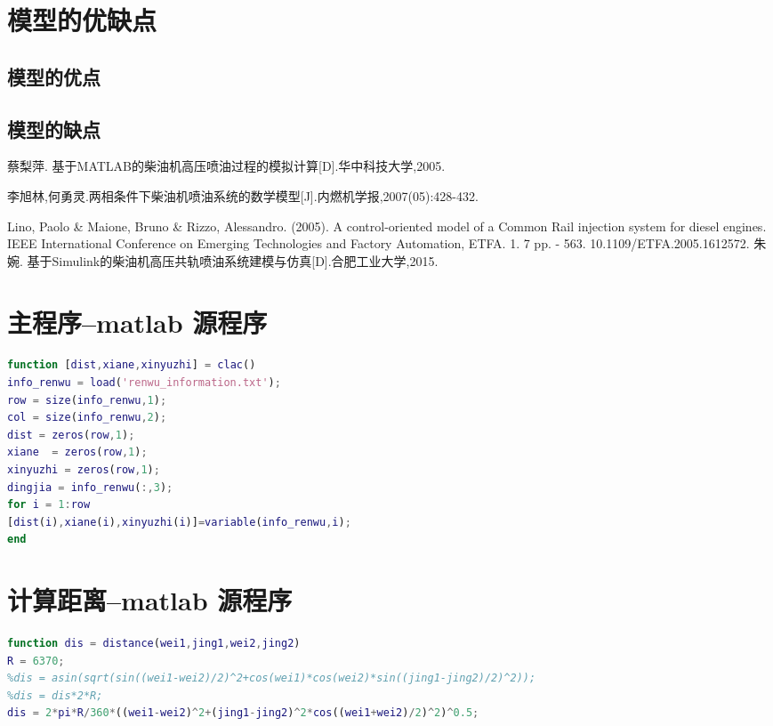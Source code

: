 \documentclass[withoutpreface,bwprint]{cumcmthesis} %
\begin{document}
{{\section{模型的优缺点}
\subsection{模型的优点}

\subsection{模型的缺点}



\begin{thebibliography}{9}%
  蔡梨萍. 基于MATLAB的柴油机高压喷油过程的模拟计算[D].华中科技大学,2005.
 
 李旭林,何勇灵.两相条件下柴油机喷油系统的数学模型[J].内燃机学报,2007(05):428-432.
 
 Lino, Paolo \& Maione, Bruno \& Rizzo, Alessandro. (2005). A control-oriented model of a Common Rail injection system for diesel engines. IEEE International Conference on Emerging Technologies and Factory Automation, ETFA. 1. 7 pp. - 563. 10.1109/ETFA.2005.1612572. 
 朱婉. 基于Simulink的柴油机高压共轨喷油系统建模与仿真[D].合肥工业大学,2015.
 

\end{thebibliography}

\newpage
\appendix
\section{主程序--matlab 源程序}
\begin{lstlisting}[language=matlab]
function [dist,xiane,xinyuzhi] = clac()
info_renwu = load('renwu_information.txt');
row = size(info_renwu,1);
col = size(info_renwu,2);
dist = zeros(row,1);
xiane  = zeros(row,1);
xinyuzhi = zeros(row,1);
dingjia = info_renwu(:,3);
for i = 1:row
[dist(i),xiane(i),xinyuzhi(i)]=variable(info_renwu,i); 
end

 \end{lstlisting}

\section{计算距离--matlab 源程序}
\begin{lstlisting}[language=matlab]
function dis = distance(wei1,jing1,wei2,jing2)
R = 6370;
%dis = asin(sqrt(sin((wei1-wei2)/2)^2+cos(wei1)*cos(wei2)*sin((jing1-jing2)/2)^2));
%dis = dis*2*R;
dis = 2*pi*R/360*((wei1-wei2)^2+(jing1-jing2)^2*cos((wei1+wei2)/2)^2)^0.5;


\end{lstlisting}}}
\end{document}
